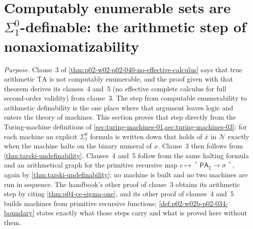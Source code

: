 \section{Computably enumerable sets are \(\Sigma^0_1\)-definable: the arithmetic step of nonaxiomatizability}
\label{sec:p02-w02b-p02-034-ce-definable}

\emph{Purpose.}  Clause~3 of \cref{thm:p02-w02-p02-040-no-effective-calculus}
says that true arithmetic \(\mathrm{TA}\) is not computably enumerable, and
the proof given with that theorem derives its clauses~4 and~5 (no effective
complete calculus for full second-order validity) from clause~3.  The step from computable
enumerability to arithmetic definability is the one place where that
argument leaves logic and enters the theory of machines.  This section
proves that step directly from the Turing-machine definitions of
\cref{sec:turing-machines-01,sec:turing-machines-03}: for each machine an
explicit \(\Sigma^0_1\) formula is written down that holds of \(\bar x\) in
\(\mathcal N\) exactly when the machine halts on the binary numeral of
\(x\).  Clause~3 then follows from \cref{thm:tarski-undefinability}.
Clauses~4 and~5 follow from the same halting formula and an arithmetical
graph for the primitive recursive map \(c\mapsto\ulcorner\mathsf{PA}_2\to\sigma\urcorner\),
again by \cref{thm:tarski-undefinability}; no machine is built and no two
machines are run in sequence.  The handbook's other proof of clause~3
obtains its arithmetic step by citing \cref{thm:p04-ce-sigma-one}, and its
other proof of clauses~4 and~5 builds machines from primitive recursive
functions; \cref{def:p02-w02b-p02-034-boundary} states exactly what those
steps carry and what is proved here without them.

